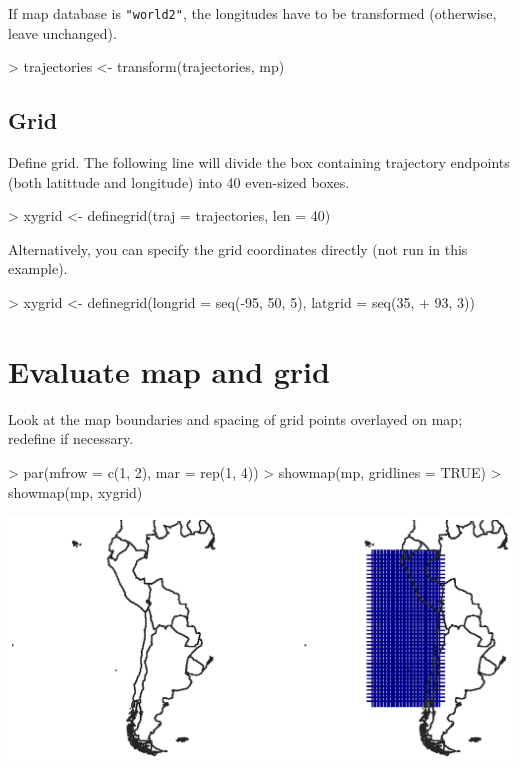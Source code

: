 \documentclass{article}
\renewenvironment{Schunk}{\vspace{\topsep}}{\vspace{\topsep}}
\begin{document}
If map database is \verb~"world2"~, the longitudes have to be transformed (otherwise, leave unchanged). 
\begin{Schunk}
\begin{Sinput}
> trajectories <- transform(trajectories, mp)
\end{Sinput}
\end{Schunk}


\subsection{Grid}
Define grid. The following line will divide the box containing trajectory
endpoints (both latittude and longitude) into 40 even-sized boxes.
\begin{Schunk}
\begin{Sinput}
> xygrid <- definegrid(traj = trajectories, len = 40)
\end{Sinput}
\end{Schunk}

Alternatively, you can specify the grid coordinates directly (not run in this example).
\begin{Schunk}
\begin{Sinput}
> xygrid <- definegrid(longrid = seq(-95, 50, 5), latgrid = seq(35, 
+     93, 3))
\end{Sinput}
\end{Schunk}

\section{Evaluate map and grid}


Look at the map boundaries and spacing of grid points overlayed on
map; redefine if necessary. 

\begin{Schunk}
\begin{Sinput}
> par(mfrow = c(1, 2), mar = rep(1, 4))
> showmap(mp, gridlines = TRUE)
> showmap(mp, xygrid)
\end{Sinput}
\end{Schunk}
\includegraphics{figures/fig-012}
\end{document}
